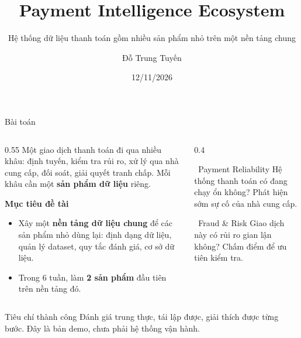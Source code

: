 \documentclass[aspectratio=169,11pt]{beamer}
\title{Payment Intelligence Ecosystem}
\subtitle{Hệ thống dữ liệu thanh toán gồm nhiều sản phẩm nhỏ trên một nền tảng chung}
\author{Đỗ Trung Tuyến}
\institute{Báo cáo thực tập}
\date{12/11/2026}
\begin{document}
\maketitle

\begin{frame}{Bài toán}
  \begin{columns}[T]
    \begin{column}{0.55\textwidth}\small
      Một giao dịch thanh toán đi qua nhiều khâu: định tuyến, kiểm tra rủi ro, xử lý qua nhà cung cấp,
      đối soát, giải quyết tranh chấp. Mỗi khâu cần một \textbf{sản phẩm dữ liệu} riêng.

      \vspace{2mm}
      \textbf{Mục tiêu đề tài}
      \begin{itemize}\small
        \item Xây một \textbf{nền tảng dữ liệu chung} để các sản phẩm nhỏ dùng lại: định dạng dữ liệu,
              quản lý dataset, quy tắc đánh giá, cơ sở dữ liệu.
        \item Trong 6 tuần, làm \textbf{2 sản phẩm} đầu tiên trên nền tảng đó.
      \end{itemize}
    \end{column}
    \begin{column}{0.4\textwidth}
      \begin{block}{\faHeartbeat\ Payment Reliability}\small
        Hệ thống thanh toán có đang chạy ổn không? Phát hiện sớm sự cố của nhà cung cấp.
      \end{block}
      \begin{block}{\faShield*\ Fraud \& Risk}\small
        Giao dịch này có rủi ro gian lận không? Chấm điểm để ưu tiên kiểm tra.
      \end{block}
    \end{column}
  \end{columns}
  \vspace{1mm}
  \begin{exampleblock}{Tiêu chí thành công}\footnotesize
    Đánh giá trung thực, tái lập được, giải thích được từng bước. Đây là bản demo, chưa phải hệ thống vận hành.
  \end{exampleblock}
\end{frame}
\end{document}
